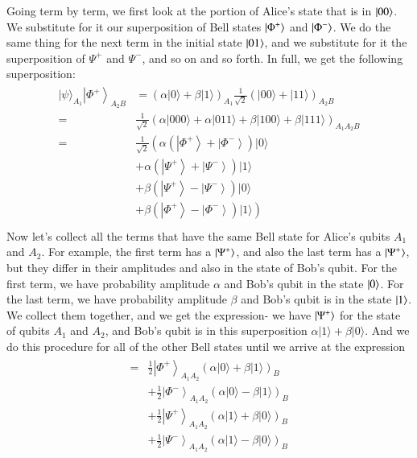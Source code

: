 Going term by term, we first look at the portion of Alice's state that is in $\left| 00 \right\rangle$.
We substitute for it our superposition of Bell states $\left| \Phi^+ \right\rangle$ and $\left| \Phi^- \right\rangle$. We do the same thing for the next term in the initial state $\left| 01 \right\rangle$, and we substitute for it the superposition of $\Psi^+$ and $\Psi^-$, and so on and so forth. In full, we get the following superposition:
\begin{align}
    \begin{aligned}
|\psi\rangle_{A_{1}}\left|\Phi^{+}\right\rangle_{A_{2} B} &=(\alpha|0\rangle+\beta|1\rangle)_{A_{1}} \frac{1}{\sqrt{2}}(|00\rangle+|11\rangle)_{A_{2} B} \\
=&\frac{1}{\sqrt{2}}(\alpha|000\rangle+\alpha|011\rangle+\beta|100\rangle+\beta|111\rangle)_{A_{1} A_{2} B} \\
=& \frac{1}{\sqrt{2}}\left(\alpha\left(\left|\Phi^{+}\right\rangle+\left|\Phi^{-}\right\rangle\right)|0\rangle\right.\\
&+\alpha\left(\left|\Psi^{+}\right\rangle+\left|\Psi^{-}\right\rangle\right)|1\rangle \\
&+\beta\left(\left|\Psi^{+}\right\rangle-\left|\Psi^{-}\right\rangle\right)|0\rangle \\
&\left.+\beta\left(\left|\Phi^{+}\right\rangle-\left|\Phi^{-}\right\rangle\right)|1\rangle\right) \\
\end{aligned}
\end{align}
Now let's collect all the terms that have the same Bell state for Alice's qubits $A_1$ and $A_2$. For example, the first term has a $\left| \Psi^+ \right\rangle$, and also the last term has a $\left| \Psi^+ \right\rangle$, but they differ in their amplitudes and also in the state of Bob's qubit. For the first term, we have probability amplitude $\alpha$ and Bob's qubit in the state $\left| 0 \right\rangle$. For the last term, we have probability amplitude $\beta$ and Bob's qubit is in the state $\left| 1 \right\rangle$. We collect them together, and we get the expression- we have $\left| \Psi^+ \right\rangle$ for the state of qubits $A_1$ and $A_2$, and Bob's qubit is in this superposition $\alpha|1\rangle+\beta|0\rangle$. And we do this procedure for all of the other Bell states until we arrive at the expression
\begin{align}
    \begin{aligned}
=&\frac{1}{2}\left|\Phi^{+}\right\rangle_{A_{1} A_{2}}(\alpha|0\rangle+\beta|1\rangle)_{B} \\
&+\frac{1}{2}\left|\Phi^{-}\right\rangle_{A_{1} A_{2}}(\alpha|0\rangle-\beta|1\rangle)_{B} \\
&+\frac{1}{2}\left|\Psi^{+}\right\rangle_{A_{1} A_{2}}(\alpha|1\rangle+\beta|0\rangle)_{B} \\
&+\frac{1}{2}\left|\Psi^{-}\right\rangle_{A_{1} A_{2}}(\alpha|1\rangle-\beta|0\rangle)_{B}
\end{aligned}
\label{eq:teleport-alice-basis}
\end{align}

